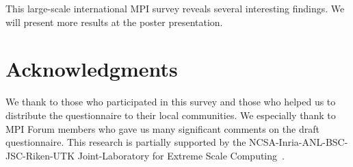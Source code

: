 \documentclass[sigconf,nonacm]{acmart}
\begin{document}
This large-scale international MPI survey reveals several interesting
findings. 
We will present more results at the poster presentation.

%

\section*{Acknowledgments}
We thank to those who participated in this survey and those who
helped us to distribute the questionnaire to their local
communities. We especially thank to MPI Forum members who gave us many
significant comments on the draft questionnaire.
This research is partially supported by the
NCSA-Inria-ANL-BSC-JSC-Riken-UTK Joint-Laboratory for Extreme Scale
Computing~\cite{JLESC}.



\end{document}
